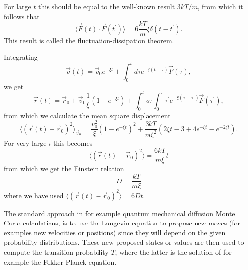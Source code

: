 For large $t$ this should be equal to the well-known result $3kT/m$, from which it follows that
\[
\langle \vec{F}(t)\cdot \vec{F}(t^{\prime })\rangle =6\frac{kT}{m}\xi \delta (t-t^{\prime }). \]
This result is called the fluctuation-dissipation theorem.

Integrating 
 \[ 
\vec{v}(t)=\vec{v}_{0}e^{-\xi t}+\int_{0}^{t}d\tau e^{-\xi (t-\tau )}\vec{F }(\tau ), \] 
we get
\[
\vec{r}(t)=\vec{r}_{0}+\vec{v}_{0}\frac{1}{\xi }(1-e^{-\xi t})+
\int_0^td\tau \int_0^{\tau}\tau ^{\prime } e^{-\xi (\tau -\tau ^{\prime })}\vec{F}(\tau ^{\prime }), \]
from which we calculate the mean square displacement 
\[
\langle ( \vec{r}(t)-\vec{r}_{0})^{2}\rangle _{\vec{v}_{0}}=\frac{v_0^2}{\xi}(1-e^{-\xi t})^{2}+\frac{3kT}{m\xi ^{2}}(2\xi t-3+4e^{-\xi t}-e^{-2\xi t}). \]
For very large $t$ this becomes
\[
\langle (\vec{r}(t)-\vec{r}_{0})^{2}\rangle =\frac{6kT}{m\xi }t \] 
from which we get the Einstein relation  
 \[ D= \frac{kT}{m\xi } \] 	
where we have used $\langle (\vec{r}(t)-\vec{r}_{0})^{2}\rangle =6Dt$.

The standard approach in for example quantum mechanical diffusion Monte Carlo calculations, is to use the Langevin equation
to propose new moves (for examples new velocities or positions) since they will depend on the given probability distributions.
These new proposed states or values are then used to compute the transition probability $T$, where the latter is the solution
of for example the Fokker-Planck equation.
 

